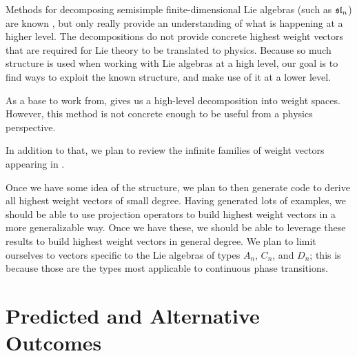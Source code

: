 \documentclass[11pt, reqno]{amsart}
\begin{document}
Methods for decomposing semisimple finite-dimensional Lie algebras (such as $\mathfrak{sl}_n$) are known \cite{Dau14}, but only really provide an understanding of what is happening at a higher level. The decompositions do not provide concrete highest weight vectors that are required for Lie theory to be translated to physics. Because so much structure is used when working with Lie algebras at a high level, our goal is to find ways to exploit the known structure, and make use of it at a lower level.

As a base to work from, \cite{Dau14} gives us a high-level decomposition into weight spaces. However, this method is not concrete enough to be useful from a physics perspective.

In addition to that, we plan to review the infinite families of weight vectors appearing in \cite{C20}. %

Once we have some idea of the structure, we plan to then generate code to derive all highest weight vectors of small degree. Having generated lots of examples, we should be able to use projection operators to build highest weight vectors in a more generalizable way. Once we have these, we should be able to leverage these results to build highest weight vectors in general degree. We plan to limit ourselves to vectors specific to the Lie algebras of types $A_{n}$, $C_{n}$, and $D_{n}$; this is because those are the types most applicable to continuous phase transitions.


\section{Predicted and Alternative Outcomes}
\end{document}
